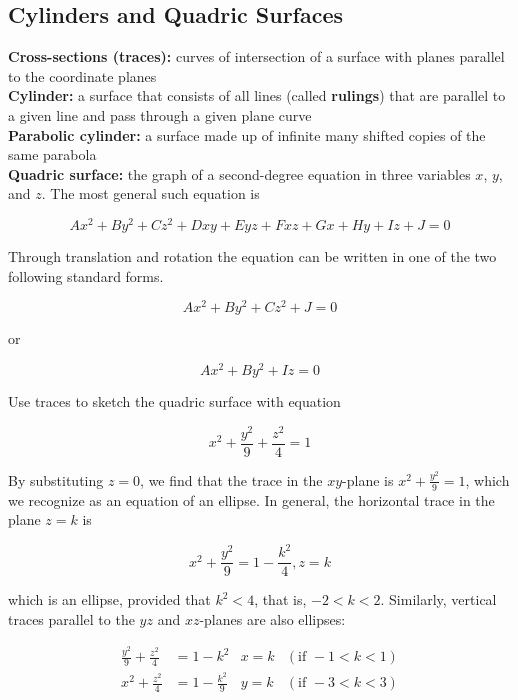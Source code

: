     \subsection{Cylinders and Quadric Surfaces}     %

        \textbf{Cross-sections (traces):} curves of intersection of a surface with planes parallel to the coordinate planes \\
        \textbf{Cylinder:} a surface that consists of all lines (called \textbf{rulings}) that are parallel to a given line and pass through a given plane curve \\
        \textbf{Parabolic cylinder:} a surface made up of infinite many shifted copies of the same parabola \\
        \textbf{Quadric surface:} the graph of a second-degree equation in three variables $x$, $y$, and $z$. The most general such equation is

        \[
            Ax^2 + By^2 + Cz^2 + Dxy + Eyz + Fxz + Gx + Hy + Iz + J = 0
        \]

        Through translation and rotation the equation can be written in one of the two following standard forms.

        \[
            Ax^2 + By^2 + Cz^2 + J = 0
        \]

        or

        \[
            Ax^2 + By^2 + Iz = 0
        \]

        \textit{} Use traces to sketch the quadric surface with equation

        \[
            x^2 + \frac{y^2}{9} + \frac{z^2}{4} = 1
        \]

        By substituting $z=0$, we find that the trace in the $xy$-plane is $x^2 + \frac{y^2}{9} = 1$, which we recognize as an equation of an ellipse. In general, the horizontal trace in the plane $z=k$ is

        \[
            x^2 + \frac{y^2}{9} = 1 - \frac{k^2}{4}, z = k
        \]

        which is an ellipse, provided that $k^2 < 4$, that is, $-2 < k < 2$. Similarly, vertical traces parallel to the $yz$ and $xz$-planes are also ellipses:

        \begin{align*}
            \frac{y^2}{9} + \frac{z^2}{4}   &= 1 - k^2  & x = k     & (\text{if } -1 < k < 1) \\
            x^2 + \frac{z^2}{4}             &= 1 - \frac{k^2}{9}    & y = k & (\text{if } - 3 < k < 3)
        \end{align*}

